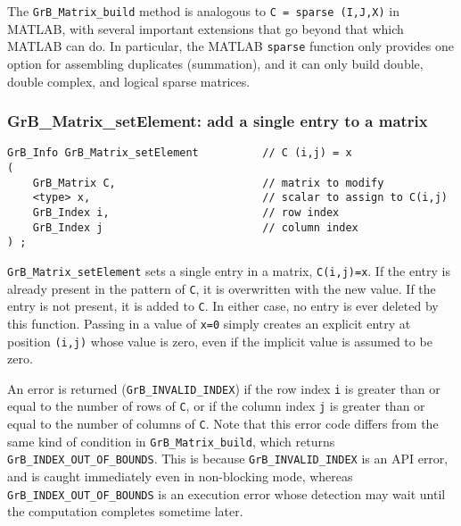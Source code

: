 \documentclass[12pt]{article}
\begin{document}
The \verb'GrB_Matrix_build' method is analogous to \verb'C = sparse (I,J,X)' in
MATLAB, with several important extensions that go beyond that which MATLAB can
do.  In particular, the MATLAB \verb'sparse' function only provides one option
for assembling duplicates (summation), and it can only build double, double
complex, and logical sparse matrices.

\subsubsection{{\sf GrB\_Matrix\_setElement:}   add a single entry to a matrix}
\label{matrix_setElement}

\begin{mdframed}[userdefinedwidth=6in]
{\footnotesize
\begin{verbatim}
GrB_Info GrB_Matrix_setElement          // C (i,j) = x
(
    GrB_Matrix C,                       // matrix to modify
    <type> x,                           // scalar to assign to C(i,j)
    GrB_Index i,                        // row index
    GrB_Index j                         // column index
) ;
\end{verbatim} } \end{mdframed}

\verb'GrB_Matrix_setElement' sets a single entry in a matrix, \verb'C(i,j)=x'.
If the entry is already present in the pattern of \verb'C', it is overwritten
with the new value.  If the entry is not present, it is added to \verb'C'.  In
either case, no entry is ever deleted by this function.  Passing in a value of
\verb'x=0' simply creates an explicit entry at position \verb'(i,j)' whose
value is zero, even if the implicit value is assumed to be zero.

An error is returned (\verb'GrB_INVALID_INDEX') if the row index \verb'i' is
greater than or equal to the number of rows of \verb'C', or if the column index
\verb'j' is greater than or equal to the number of columns of \verb'C'.  Note
that this error code differs from the same kind of condition in
\verb'GrB_Matrix_build', which returns \verb'GrB_INDEX_OUT_OF_BOUNDS'.  This is
because \verb'GrB_INVALID_INDEX' is an API error, and is caught immediately
even in non-blocking mode, whereas \verb'GrB_INDEX_OUT_OF_BOUNDS' is an
execution error whose detection may wait until the computation completes
sometime later.
\end{document}
